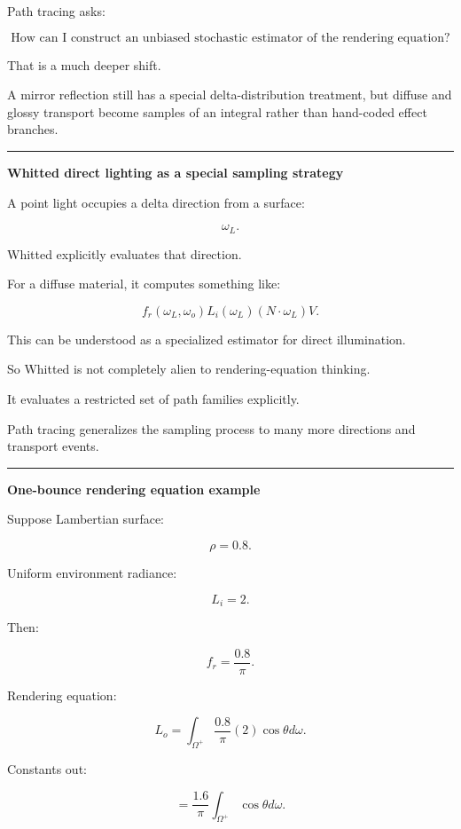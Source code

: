 Path tracing asks:

\[
\boxed{
\text{How can I construct an unbiased stochastic estimator of the rendering equation?}
}
\]

That is a much deeper shift.

A mirror reflection still has a special delta-distribution treatment, but diffuse and glossy transport become samples of an integral rather than hand-coded effect branches.

\begin{center}\rule{0.5\linewidth}{0.5pt}\end{center}

\textbf{Whitted direct lighting as a special sampling strategy}

A point light occupies a delta direction from a surface:

\[
\omega_L.
\]

Whitted explicitly evaluates that direction.

For a diffuse material, it computes something like:

\[
f_r(\omega_L,\omega_o)
L_i(\omega_L)
(N\cdot\omega_L)
V.
\]

This can be understood as a specialized estimator for direct illumination.

So Whitted is not completely alien to rendering-equation thinking.

It evaluates a restricted set of path families explicitly.

Path tracing generalizes the sampling process to many more directions and transport events.

\begin{center}\rule{0.5\linewidth}{0.5pt}\end{center}

\textbf{One-bounce rendering equation example}

Suppose Lambertian surface:

\[
\rho=0.8.
\]

Uniform environment radiance:

\[
L_i=2.
\]

Then:

\[
f_r=
\frac{0.8}{\pi}.
\]

Rendering equation:

\[
L_o
=
\int_{\Omega^+}
\frac{0.8}{\pi}
(2)
\cos\theta
d\omega.
\]

Constants out:

\[
=
\frac{1.6}{\pi}
\int_{\Omega^+}
\cos\theta d\omega.
\]

